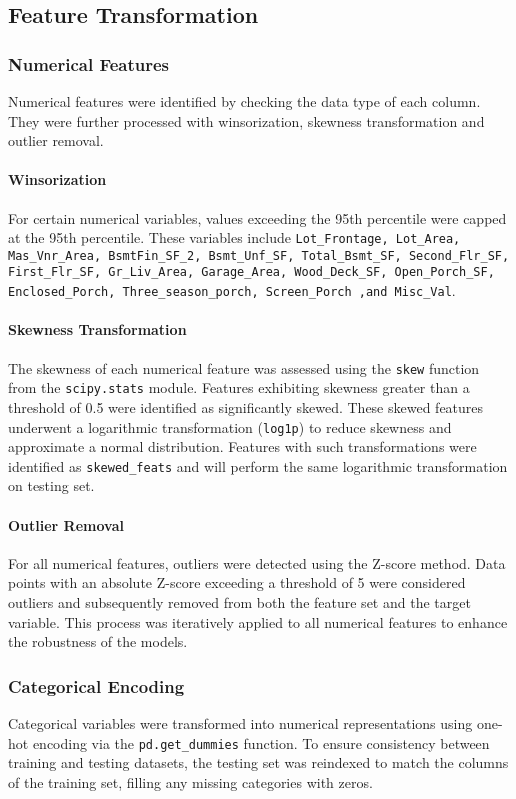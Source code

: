 \documentclass[11pt,a4paper]{article}
\begin{document}
\subsection{Feature Transformation}
\subsubsection{Numerical Features}
Numerical features were identified by checking the data type of each column.
They were further processed with winsorization, skewness transformation and
outlier removal.

\paragraph{Winsorization}
For certain numerical variables, values exceeding the 95th percentile were
capped at the 95th percentile. These variables include \texttt{Lot\_Frontage,
  Lot\_Area, Mas\_Vnr\_Area, BsmtFin\_SF\_2, Bsmt\_Unf\_SF, Total\_Bsmt\_SF,
  Second\_Flr\_SF, First\_Flr\_SF, Gr\_Liv\_Area, Garage\_Area, Wood\_Deck\_SF,
  Open\_Porch\_SF, Enclosed\_Porch, Three\_season\_porch, Screen\_Porch ,and
  Misc\_Val}.

\paragraph{Skewness Transformation}
The skewness of each numerical feature was assessed using the \texttt{skew}
function from the \texttt{scipy.stats} module. Features exhibiting skewness
greater than a threshold of 0.5 were identified as significantly skewed. These
skewed features underwent a logarithmic transformation (\texttt{log1p}) to
reduce skewness and approximate a normal distribution. Features with such
transformations were identified as \texttt{skewed\_feats} and will perform the
same logarithmic transformation on testing set.

\paragraph{Outlier Removal}
For all numerical features, outliers were detected using the Z-score method.
Data points with an absolute Z-score exceeding a threshold of 5 were considered
outliers and subsequently removed from both the feature set and the target
variable. This process was iteratively applied to all numerical features to
enhance the robustness of the models.

\subsubsection{Categorical Encoding}
Categorical variables were transformed into numerical representations using
one-hot encoding via the \texttt{pd.get\_dummies} function. To ensure
consistency between training and testing datasets, the testing set was
reindexed to match the columns of the training set, filling any missing
categories with zeros.
\end{document}
